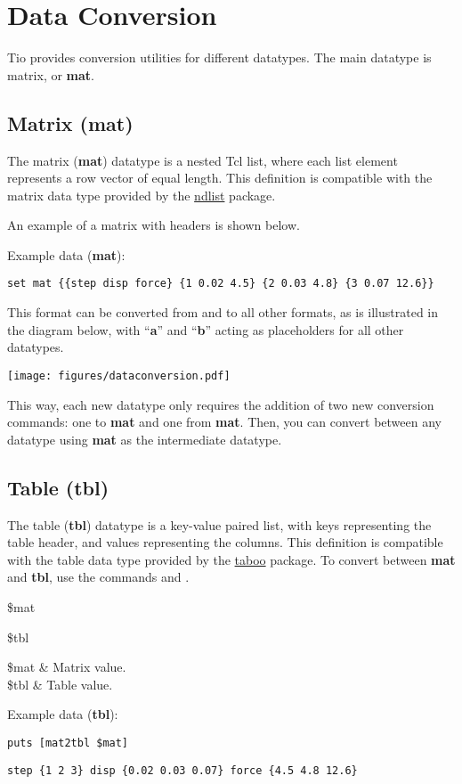 \documentclass{article}
\begin{document}
\clearpage
\section{Data Conversion}
Tio provides conversion utilities for different datatypes. The main datatype is matrix, or \textbf{mat}. 
\subsection{Matrix (mat)}
The matrix (\textbf{mat}) datatype is a nested Tcl list, where each list element represents a row vector of equal length.
This definition is compatible with the matrix data type provided by the \textcolor{blue}{\href{https://github.com/ambaker1/ndlist}{ndlist}} package. 

An example of a matrix with headers is shown below. 
\begin{example}{Example data (\textbf{mat}):}
\begin{lstlisting}
set mat {{step disp force} {1 0.02 4.5} {2 0.03 4.8} {3 0.07 12.6}}
\end{lstlisting}
\end{example}
This format can be converted from and to all other formats, as is illustrated in the diagram below, with ``\textbf{a}'' and ``\textbf{b}'' acting as placeholders for all other datatypes.
\begin{center}
\texttt{[image: figures/dataconversion.pdf]}
\end{center}
This way, each new datatype only requires the addition of two new conversion commands: one to \textbf{mat} and one from \textbf{mat}.
Then, you can convert between any datatype using \textbf{mat} as the intermediate datatype.
\clearpage
\subsection{Table (tbl)}
The table (\textbf{tbl}) datatype is a key-value paired list, with keys representing the table header, and values representing the columns.
This definition is compatible with the table data type provided by the \textcolor{blue}{\href{https://github.com/ambaker1/taboo}{taboo}} package.
To convert between \textbf{mat} and \textbf{tbl}, use the commands  and .
\begin{syntax}
 \$mat
\end{syntax}
\begin{syntax}
 \$tbl
\end{syntax}
\begin{args}
\$mat & Matrix value. \\
\$tbl & Table value. 
\end{args}
\begin{example}{Example data (\textbf{tbl}):}
\begin{lstlisting}
puts [mat2tbl $mat]
\end{lstlisting}
\tcblower
\begin{lstlisting}
step {1 2 3} disp {0.02 0.03 0.07} force {4.5 4.8 12.6}
\end{lstlisting}
\end{example}
\clearpage
\end{document}
